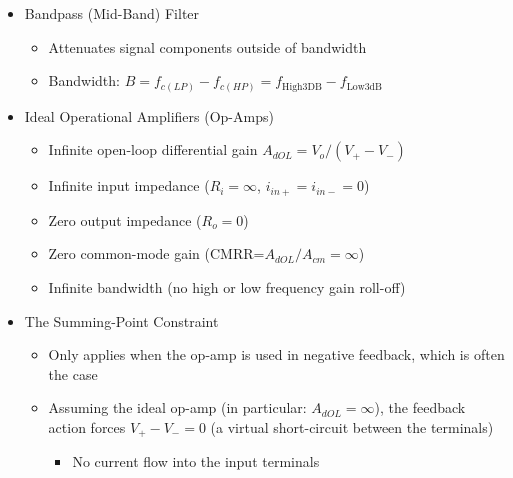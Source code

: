 \begin{itemize}
\begin{itemize}
\begin{itemize}
        \end{itemize}

    \end{itemize}

  \item Bandpass (Mid-Band) Filter

    \begin{itemize}

      \item Attenuates signal components outside of bandwidth

      \item Bandwidth: $B=f_{c(LP)}-f_{c(HP)}=f_{\text{High3DB}}-f_{\text{Low3dB}}$

    \end{itemize}

  \item Ideal Operational Amplifiers (Op-Amps)

    \begin{itemize}

      \item Infinite open-loop differential gain $A_{dOL}=V_o/(V_+-V_-)$

      \item Infinite input impedance ($R_i=\infty$, $i_{in+}=i_{in-}=0$)

      \item Zero output impedance ($R_o=0$)

      \item Zero common-mode gain (CMRR=$A_{dOL}/A_{cm}=\infty$)

      \item Infinite bandwidth (no high or low frequency gain roll-off)

    \end{itemize}

  \item The Summing-Point Constraint

    \begin{itemize}

      \item Only applies when the op-amp is used in negative feedback, which is often the case

      \item Assuming the ideal op-amp (in particular: $A_{dOL}=\infty$), the feedback action forces $V_+-V_-=0$ (a virtual short-circuit between the terminals)

        \begin{itemize}

          \item No current flow into the input terminals

        \end{itemize}

    \end{itemize}

\end{itemize}



